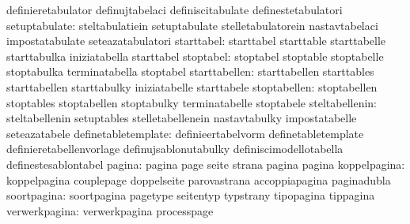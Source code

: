                                   definieretabulator               definujtabelaci
                                  definiscitabulate                definestetabulatori
                   setuptabulate: steltabulatiein                  setuptabulate
                                  stelletabulatorein               nastavtabelaci
                                  impostatabulate                  seteazatabulatori
                      starttabel: starttabel                       starttable
                                  starttabelle                     starttabulka
                                  iniziatabella                    starttabel
                       stoptabel: stoptabel                        stoptable
                                  stoptabelle                      stoptabulka
                                  terminatabella                   stoptabel
                   starttabellen: starttabellen                    starttables
                                  starttabellen                    starttabulky
                                  iniziatabelle                    starttabele
                    stoptabellen: stoptabellen                     stoptables
                                  stoptabellen                     stoptabulky
                                  terminatabelle                   stoptabele
                  steltabellenin: steltabellenin                   setuptables
                                  stelletabellenein                nastavtabulky
                                  impostatabelle                   seteazatabele
             definetabletemplate: definieertabelvorm               definetabletemplate
                                  definieretabellenvorlage         definujsablonutabulky
                                  definiscimodellotabella          definestesablontabel
                          pagina: pagina                           page
                                  seite                            strana
                                  pagina                           pagina
                    koppelpagina: koppelpagina                     couplepage
                                  doppelseite                      parovastrana
                                  accoppiapagina                   paginadubla
                     soortpagina: soortpagina                      pagetype
                                  seitentyp                        typstrany
                                  tipopagina                       tippagina
                   verwerkpagina: verwerkpagina                    processpage
